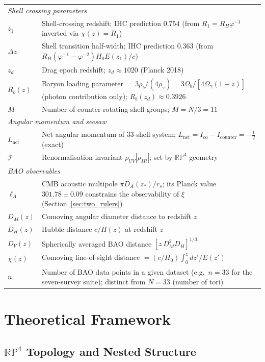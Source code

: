 \documentclass[12pt,a4paper]{article}
\begin{document}
\begin{longtable}{p{2.8cm} p{9.5cm}}
\multicolumn{2}{l}{\textit{Shell crossing parameters}} \\[2pt]
$z_1$ & Shell-crossing redshift; IHC prediction $0.754$ (from $R_1 = R_H\varphi^{-1}$ inverted via $\chi(z) = R_1$) \\
$\Delta z$ & Shell transition half-width; IHC prediction $0.363$ (from $R_H(\varphi^{-1}-\varphi^{-2})H_0 E(z_1)/c$) \\
$z_d$ & Drag epoch redshift; $z_d \approx 1020$ (Planck 2018) \\
$R_b(z)$ & Baryon loading parameter $= 3\rho_b/(4\rho_\gamma) = 3\Omega_b/[4\Omega_\gamma(1+z)]$ (photon contribution only); $R_b(z_d) \approx 0.3926$ \\
$M$ & Number of counter-rotating shell groups; $M = N/3 = 11$ \\[6pt]
\multicolumn{2}{l}{\textit{Angular momentum and seesaw}} \\[2pt]
$L_\mathrm{net}$ & Net angular momentum of 33-shell system; $L_\mathrm{net} = I_\mathrm{co} - I_\mathrm{counter} = -\tfrac{1}{2}$ (exact) \\
$\mathcal{I}$ & Renormalisation invariant $\rho_{UV}|\rho_{IR}|$; set by $\mathbb{RP}^4$ geometry \\[6pt]
\multicolumn{2}{l}{\textit{BAO observables}} \\[2pt]
$\ell_A$ & CMB acoustic multipole $\pi D_A(z_*)/r_s$; its Planck value $301.78 \pm 0.09$ constrains the observability of $\xi$ (Section~\ref{sec:two_rulers}) \\
$D_M(z)$ & Comoving angular diameter distance to redshift $z$ \\
$D_H(z)$ & Hubble distance $c/H(z)$ at redshift $z$ \\
$D_V(z)$ & Spherically averaged BAO distance $[z\,D_M^2 D_H]^{1/3}$ \\
$\chi(z)$ & Comoving line-of-sight distance $= (c/H_0)\int_0^z dz'/E(z')$ \\
$n$ & Number of BAO data points in a given dataset (e.g.\ $n=33$ for the seven-survey suite); distinct from $N=33$ (number of tori) \\[6pt]
\bottomrule
\end{longtable}

\section{Theoretical Framework}

\subsection{\texorpdfstring{$\mathbb{RP}^4$}{RP4} Topology and Nested Structure}
\label{sec:rp4_topo}
\end{document}
